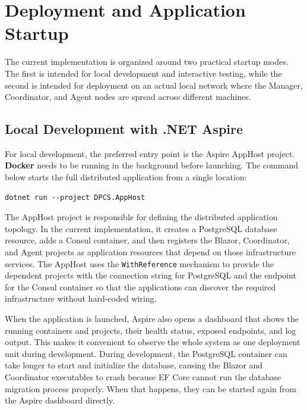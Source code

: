 
\section{Deployment and Application Startup}

The current implementation is organized around two practical startup modes. The first is intended for local development and interactive testing, while the second is intended for deployment on an actual local network where the Manager, Coordinator, and Agent nodes are spread across different machines.

\subsection{Local Development with .NET Aspire}

For local development, the preferred entry point is the Aspire AppHost project. \textbf{Docker} needs to be running in the background before launching. The command below starts the full distributed application from a single location:

\begin{verbatim}
dotnet run --project DPCS.AppHost
\end{verbatim}

The AppHost project is responsible for defining the distributed application topology. In the current implementation, it creates a PostgreSQL database resource, adds a Consul container, and then registers the Blazor, Coordinator, and Agent projects as application resources that depend on those infrastructure services. The AppHost uses the \verb|WithReference| mechanism to provide the dependent projects with the connection string for PostgreSQL and the endpoint for the Consul container so that the applications can discover the required infrastructure without hard-coded wiring.

When the application is launched, Aspire also opens a dashboard that shows the running containers and projects, their health status, exposed endpoints, and log output. This makes it convenient to observe the whole system as one deployment unit during development. During development, the PostgreSQL container can take longer to start and initialize the database, causing the Blazor and Coordinator executables to crash because EF Core cannot run the database migration process properly. When that happens, they can be started again from the Aspire dashboard directly.

